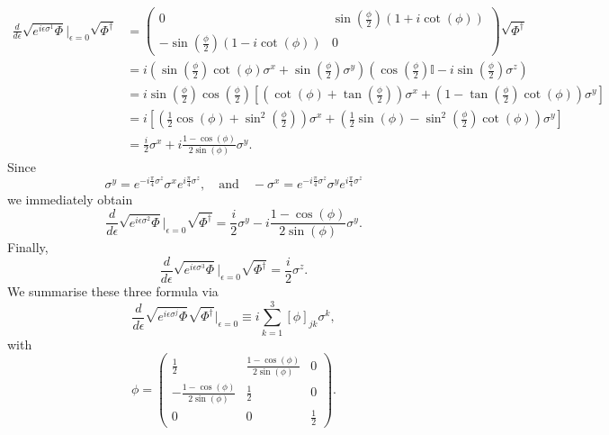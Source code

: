 \documentclass[12pt]{amsart}
\theoremstyle{definition}
\theoremstyle{remark}
\numberwithin{equation}{section}
\begin{document}
\begin{equation}
	\begin{split}
	\frac{d}{d\epsilon}\sqrt{e^{i\epsilon \sigma^1}\Phi}\bigg|_{\epsilon =0}\sqrt{\Phi^\dag} &= \begin{pmatrix} 0 & \sin(\frac{\phi}{2})(1+i\cot(\phi)) \\ -\sin(\frac{\phi}{2})(1-i\cot(\phi)) & 0\end{pmatrix} \sqrt{\Phi^\dag} \\ &=i(\sin(\tfrac{\phi}{2})\cot(\phi)\sigma^x + \sin(\tfrac{\phi}{2})\sigma^y)(\cos(\tfrac{\phi}{2})\mathbb{I} - i\sin(\tfrac{\phi}{2})\sigma^z)\\ &= i\sin(\tfrac{\phi}{2})\cos(\tfrac{\phi}{2})[(\cot(\phi) + \tan(\tfrac{\phi}{2})) \sigma^x + (1 - \tan(\tfrac{\phi}{2})\cot(\phi))\sigma^y ] \\
	&= i[ (\tfrac12\cos(\phi)+ \sin^2(\tfrac{\phi}{2}))\sigma^x + (\tfrac12 \sin(\phi) - \sin^2(\tfrac{\phi}{2})\cot(\phi))\sigma^y ] \\
	&= \frac{i}{2}\sigma^x + i\frac{1-\cos(\phi)}{2\sin(\phi)}\sigma^y.
	\end{split}
\end{equation}
Since 
\begin{equation}
	\sigma^y = e^{-i\frac{\pi}{4}\sigma^z}\sigma^xe^{i\frac{\pi}{4}\sigma^z}, \quad \text{and}\quad -\sigma^x = e^{-i\frac{\pi}{4}\sigma^z}\sigma^ye^{i\frac{\pi}{4}\sigma^z}
\end{equation}
we immediately obtain
\begin{equation}
	\frac{d}{d\epsilon}\sqrt{e^{i\epsilon \sigma^2}\Phi}\bigg|_{\epsilon =0}\sqrt{\Phi^\dag} = \frac{i}{2}\sigma^y - i\frac{1-\cos(\phi)}{2\sin(\phi)}\sigma^y.
\end{equation}
Finally, 
\begin{equation}
	\frac{d}{d\epsilon}\sqrt{e^{i\epsilon \sigma^3}\Phi}\bigg|_{\epsilon =0}\sqrt{\Phi^\dag} = \frac{i}{2}  \sigma^z.
\end{equation}
We summarise these three formula via
\begin{equation}
	\frac{d}{d\epsilon}\sqrt{e^{i\epsilon \sigma^j}\Phi}\sqrt{\Phi^\dag} \bigg|_{\epsilon =0} \equiv i\sum_{k=1}^3 [\phi]_{jk} \sigma^k,
\end{equation}
with 
\begin{equation}
	\phi = \begin{pmatrix}\frac12 & \frac{1-\cos(\phi)}{2\sin(\phi)} & 0 \\ -\frac{1-\cos(\phi)}{2\sin(\phi)} & \frac12 & 0 \\ 0 & 0 & \frac12\end{pmatrix}.
\end{equation}
\end{document}
